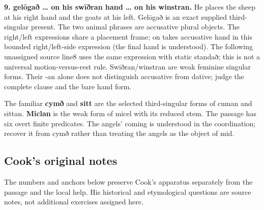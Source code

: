 \textbf{9. gelōgað … on his swīðran hand … on his winstran.} He places the sheep at his right hand and the goats at his left. Gelōgað is an exact supplied third-singular present. The two animal phrases are accusative plural objects. The right/\allowbreak{}left expressions share a placement frame; on takes accusative hand in this bounded right/\allowbreak{}left-side expression (the final hand is understood). The following unassigned source line8 uses the same expression with static standað; this is not a universal motion-versus-rest rule. Swīðran/\allowbreak{}winstran are weak feminine singular forms. Their -an alone does not distinguish accusative from dative; judge the complete clause and the bare hand form.

The familiar \textbf{cymð} and \textbf{sitt} are the selected third-singular forms of cuman and sittan. \textbf{Miclan} is the weak form of micel with its reduced stem. The passage has six overt finite predicates. The angels' coming is understood in the coordination; recover it from cymð rather than treating the angels as the object of mid.

\subsection*{Cook's original notes}

The numbers and anchors below preserve Cook's apparatus separately from the passage and the local help. His historical and etymological questions are source notes, not additional exercises assigned here.

